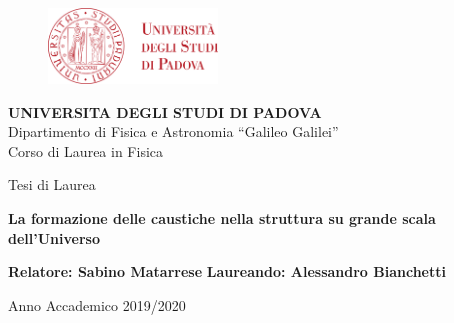 \begin{titlepage}
    \begin{center}

        \begin{figure}[H]
            \centering
            \includegraphics[width=0.4\textwidth]{unipd_logo.png}
        \end{figure}

        \vspace{0.5cm}

        \LARGE
        \textbf{UNIVERSITA DEGLI STUDI DI PADOVA}\\
        Dipartimento di Fisica e Astronomia “Galileo Galilei”\\
        Corso di Laurea in Fisica\\

        \vspace{1cm}

        Tesi di Laurea
        \vspace*{1.5cm}

        \Huge
        \textbf{La formazione delle caustiche nella struttura su grande scala dell'Universo}
        \vspace{1.5cm}

    \end{center}

    \vspace{5cm}

    
    \normalsize
    \textbf{Relatore: Sabino Matarrese} \hspace{4cm} \textbf{Laureando: Alessandro Bianchetti}
    \vspace{3cm}

    \LARGE
    \begin{center}
        Anno Accademico 2019/2020
    \end{center}

    
\end{titlepage}